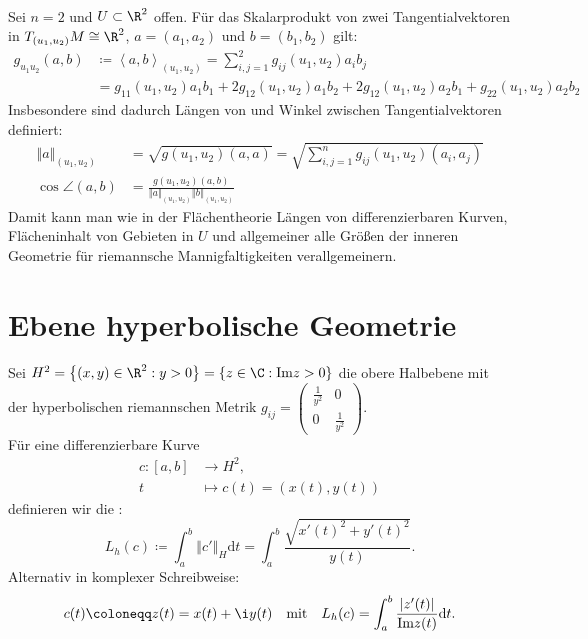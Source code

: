 \begin{remark}
  \ \\
  Sei \( n = 2 \) und \( U \subset \R^2 \) offen. Für das Skalarprodukt von zwei Tangentialvektoren in \( T_{(u_1,u_2)}M \cong \R^2 \), \( a = (a_1, a_2) \) und \( b = (b_1,b_2) \) gilt:
  \begin{align*}
    g_{u_1 u_2}(a,b) &\coloneqq \left\langle a,b \right\rangle_{(u_1, u_2)} = \sum_{i,j = 1}^2 g_{ij}(u_1,u_2)a_i b_j \\
     &= g_{11}(u_1, u_2)a_1 b_1 + 2g_{12}(u_1, u_2)a_1 b_2 + 2g_{12}(u_1, u_2)a_2b_1 + g_{22}(u_1,u_2)a_2 b_2
  \end{align*}
  Insbesondere sind dadurch Längen von und Winkel zwischen Tangentialvektoren definiert:
  \begin{align*}
    \left\Vert a \right\Vert_{(u_1, u_2)} &= \sqrt{g(u_1,u_2)(a,a)} = \sqrt{\sum_{i,j = 1}^n g_{ij}(u_1,u_2)(a_i,a_j)} \\
    \cos \angle (a,b) &= \frac{g(u_1,u_2)(a,b)}{\left\Vert a \right\Vert_{(u_1,u_2)} \left\Vert b \right\Vert_{(u_1,u_2)}}
  \end{align*}
  Damit kann man wie in der Flächentheorie Längen von differenzierbaren Kurven, Flächeninhalt von Gebieten in \( U \) und allgemeiner alle Größen der inneren Geometrie für riemannsche Mannigfaltigkeiten verallgemeinern.
\end{remark}

\section{Ebene hyperbolische Geometrie}

\begin{definition}
  Sei \( H^2 = \left \{ (x,y) \in \R^2 : y > 0 \right \} = \left \{ z \in \C : \text{Im} z > 0 \right \} \) die obere Halbebene mit der hyperbolischen riemannschen Metrik \( g_{ij} = \left( \begin{smallmatrix}
    \tfrac{1}{y^2} & 0 \\ 0 & \tfrac{1}{y^2}
  \end{smallmatrix} \right) \). \\
  Für eine differenzierbare Kurve 
  \begin{align*}
    c: [a,b] &\to H^2\text{,} \\
    t &\mapsto c(t) = (x(t),y(t))
  \end{align*}
  definieren wir die :
  \begin{equation*}
    L_h(c) \coloneqq \int_a^b \left\Vert c' \right\Vert_H \text{d}t = \int_a^b \frac{\sqrt{{x'(t)}^2 + {y'(t)}^2}}{y(t)}\text{.}
  \end{equation*}
  Alternativ in komplexer Schreibweise:
  \begin{equation*}
    c(t) \coloneqq z(t) = x(t) + \i y(t) \quad \text{mit} \quad L_h(c) = \int_a^b \frac{\left\vert z'(t) \right\vert}{\text{Im} z(t)}\text{d}t\text{.}
  \end{equation*}
\end{definition}

